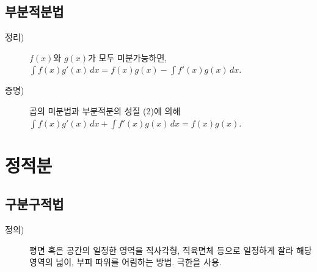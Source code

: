 \documentclass{oblivoir}
\newcommand{\bd}{\begin{description}}
\newcommand{\ed}{\end{description}}
\begin{document}
\subsection{부분적분법}
\bd
\item[정리)]
\(f(x)\)와 \(g(x)\)가 모두 미분가능하면, \(\int f(x)g'(x)\,dx=f(x)g(x)-\int f'(x)g(x)\,dx\).
\item[증명)]
곱의 미분법과 부분적분의 성질 (2)에 의해
\(\int f(x)g'(x)\,dx+\int f'(x)g(x)\,dx=f(x)g(x)\).
\ed


\section{정적분}
\subsection{구분구적법}
\bd
\item[정의)]
평면 혹은 공간의 일정한 영역을 직사각형, 직육면체 등으로 일정하게 잘라 해당 영역의 넓이, 부피 따위를 어림하는 방법. 극한을 사용.
\ed
\end{document}
